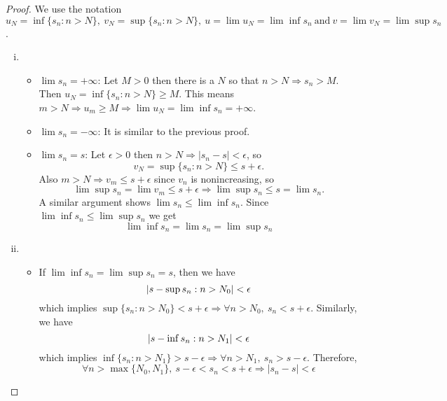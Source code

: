 \documentclass[12pt, lettersize]{book}
\theoremstyle{plain}
\theoremstyle{definition}
\theoremstyle{remark}
\begin{document}
		\begin{proof}
		We use the notation $u_N=\inf\{s_n: n>N\},\ v_N=\sup \{s_n: n>N\},\ u=\lim u_N=\lim\inf s_n\ \text{and}\ v=\lim v_N=\lim\sup s_n$.
		\begin{enumerate}[(i)]
			\item \begin{itemize}
					  \item $\lim s_n=+\infty$: Let $M>0$ then there is a $N$ so that $n>N\Rightarrow s_n>M$. Then
					  $u_N=\inf\{s_n: n>N\}\geq M$. This means $m>N\Rightarrow u_m\geq M\Rightarrow\lim u_N=\lim\inf s_n=+\infty$.
					  \item $\lim s_n=-\infty$: It is similar to the previous proof.
					  \item $\lim s_n=s$: Let $\epsilon>0$ then $n>N\Rightarrow |s_n-s|<\epsilon$, so
					  \begin{displaymath}
					  	v_N=\sup\{s_n: n>N\}\leq s+\epsilon.
					  \end{displaymath}
				  	  Also $m>N\Rightarrow v_m\leq s+\epsilon$ since $v_n$ is nonincreasing, so 
				  	  \begin{displaymath}
				  	  	\lim\sup s_n=\lim v_m\leq s+\epsilon\Rightarrow\lim\sup s_n\leq s=\lim s_n.
				  	  \end{displaymath}
			  	  	  A similar argument shows $\lim s_n\leq\lim\inf s_n$. Since $\lim\inf s_n\leq\lim\sup s_n$ we get
			  	  	  \begin{displaymath}
			  	  	  	\lim\inf s_n=\lim s_n=\lim\sup s_n
			  	  	  \end{displaymath}
				  \end{itemize}
			\item \begin{itemize}
					  \item If $\lim\inf s_n=\lim\sup s_n=s$, then we have
					  \begin{displaymath}
					  	\abs{s-\sup{s_n:n>N_0}}<\epsilon
					  \end{displaymath}
				  	  which implies $\sup\{s_n: n>N_0\}<s+\epsilon\Rightarrow\forall n>N_0,\ s_n<s+\epsilon$.
				  	  Similarly, we have 
				  	  \begin{displaymath}
				  	  	\abs{s-\inf{s_n:n>N_1}}<\epsilon
				  	  \end{displaymath}
			  	  	  which implies $\inf\{s_n: n>N_1\}>s-\epsilon\Rightarrow\forall n>N_1,\ s_n>s-\epsilon$.
			  	  	  Therefore,
			  	  	  \begin{displaymath}
			  	  	  	\forall n>\max\{N_0,N_1\},\ s-\epsilon<s_n<s+\epsilon\Rightarrow |s_n-s|<\epsilon	

\end{displaymath}
\end{itemize}
\end{enumerate}
\end{proof}
\end{document}
